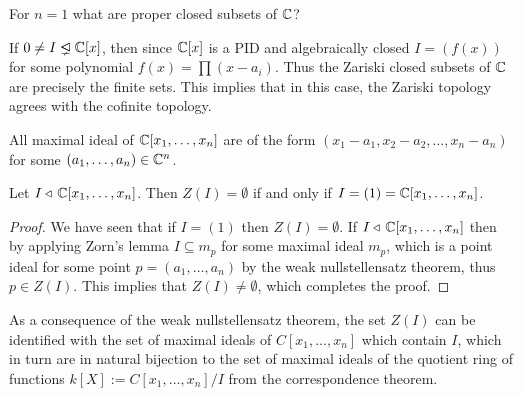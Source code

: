 \documentclass[11pt,a4paper]{article}
\begin{document}
\begin{question}
  For $n = 1$ what are proper closed subsets of $\mathbb{C}$?
\end{question}
\begin{answer}
  If $0 \neq I \properideal \C[x]$,
  then since $\mathbb{C}[x]$ is a PID and algebraically closed $I = (f(x))$
  for some polynomial $f(x) = \prod (x - a_i)$.
  Thus the Zariski closed subsets of $\mathbb{C}$ are precisely the finite sets.
  This implies that in this case,
  the Zariski topology agrees with the cofinite topology.
\end{answer}

\begin{theorem}
  All maximal ideal of $\mathbb{C}[x_1,\dots,x_n]$ are of the form
  $(x_1 - a_1,x_2 - a_2,\dots,x_n - a_n)$ for some $(a_1,\dots,a_n) \in \mathbb{C}^n$.
\end{theorem}
\begin{corollary}
  \label{cor:zorns}
  Let $I \triangleleft\, \mathbb{C}[x_1,\dots,x_n]$.
  Then $Z(I) = \emptyset$ if and only if $I = (1) = \mathbb{C}[x_1,\dots,x_n]$.
\end{corollary}
\begin{proof}
  We have seen that if $I = (1)$ then $Z(I) = \emptyset$.
  If $I \triangleleft\, \mathbb{C}[x_1,\dots,x_n]$ %
  then by applying Zorn's lemma $I \subseteq m_p$
  for some maximal ideal $m_p$, which is a point ideal for some point
  $p = (a_1,\dots,a_n)$ by the weak nullstellensatz theorem,
  thus $p \in Z(I)$.
  This implies that $Z(I) \neq \emptyset$,
  which completes the proof.
\end{proof}

\begin{remark}
  As a consequence of the weak nullstellensatz theorem, the set
  $Z(I)$ can be identified with the set of maximal ideals of $C[x_1,\dots,x_n]$
  which contain $I$, which in turn are in natural bijection to the
  set of maximal ideals of the quotient ring of functions
  $k[X] := C[x_1,\dots,x_n]/I$ from the correspondence theorem.
\end{remark}
\end{document}
